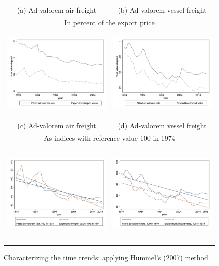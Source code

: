 \documentclass[a4paper,11pt]{article}
\begin{document}
\begin{figure}[htbp]
\caption{Characterizing the time trends: applying Hummel's (2007) method }
\label{fig:comp_effects_as_in_Hummels}
\begin{center}
\begin{tabular}{cc}
{\small (a) Ad-valorem air freight} & {\small (b) Ad-valorem vessel freight}\\
\multicolumn{2}{c}{{\small In percent of the export price}} \\
\includegraphics[width=2.5in, height=1.8in]{figure5_comme_hummels.jpg}
& \includegraphics[width=2.5in,height=1.8in]{figure6_comme_hummels.jpg} \\
{\small (c) Ad-valorem air freight} & {\small (d) Ad-valorem vessel freight}\\
\multicolumn{2}{c}{{\small As indices with reference value 100 in 1974} }\\
\includegraphics[width=2.5in, height=2in]{figure5_comme_hummels_base100.jpg}
& \includegraphics[width=2.5in,height=2in]{figure6_comme_hummels_base100.jpg} \\
\end{tabular}
\end{center}
\end{figure}
\end{document}
